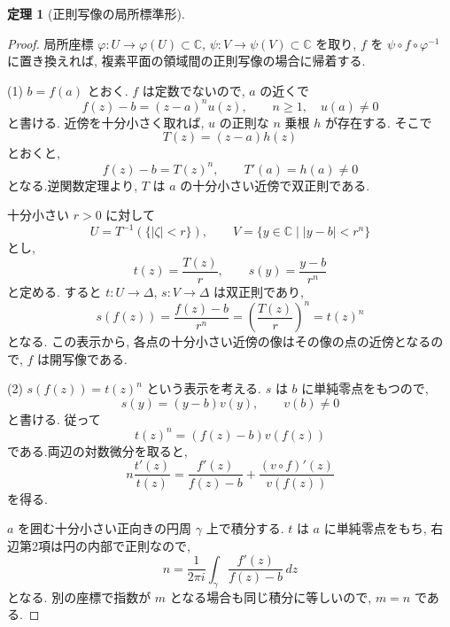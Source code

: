 \documentclass[dvipdfmx,a4paper,11pt]{article} %
\newcommand{\C}{\mathbb{C}}
\theoremstyle{definition}
\newtheorem{thm}{定理}[section]
\numberwithin{equation}{section}
\begin{document}
\begin{thm}[正則写像の局所標準形]
\begin{center}
\end{center}

\end{thm}
\begin{proof}
局所座標 $\varphi:U\to\varphi(U)\subset\C$, $\psi:V\to\psi(V)\subset\C$ を取り, $f$ を $\psi\circ f\circ\varphi^{-1}$ に置き換えれば, 複素平面の領域間の正則写像の場合に帰着する.

(1) $b=f(a)$ とおく.
$f$ は定数でないので, $a$ の近くで
\[
f(z)-b=(z-a)^n u(z),\qquad n\geq1,\quad u(a)\neq0
\]
と書ける.
近傍を十分小さく取れば, $u$ の正則な $n$ 乗根 $h$ が存在する.
そこで
\[
T(z)=(z-a)h(z)
\]
とおくと, 
\[
f(z)-b=T(z)^n,\qquad T'(a)=h(a)\neq0
\]
となる.逆関数定理より, $T$ は $a$ の十分小さい近傍で双正則である.

十分小さい $r>0$ に対して
\[
U=T^{-1}(\{|\zeta|<r\}),\qquad
V=\{y\in\C\mid |y-b|<r^n\}
\]
とし, 
\[
t(z)=\frac{T(z)}r,\qquad s(y)=\frac{y-b}{r^n}
\]
と定める.
すると $t:U\to\Delta$, $s:V\to\Delta$ は双正則であり, 
\[
s(f(z))=\frac{f(z)-b}{r^n}
=\left(\frac{T(z)}r\right)^n=t(z)^n
\]
となる.
この表示から, 各点の十分小さい近傍の像はその像の点の近傍となるので, 
$f$ は開写像である.

(2) $s(f(z))=t(z)^n$ という表示を考える.
$s$ は $b$ に単純零点をもつので, 
\[
s(y)=(y-b)v(y),\qquad v(b)\neq0
\]
と書ける.
従って
\[
t(z)^n=(f(z)-b)v(f(z))
\]
である.両辺の対数微分を取ると, 
\[
n\frac{t'(z)}{t(z)}
=
\frac{f'(z)}{f(z)-b}
+\frac{(v\circ f)'(z)}{v(f(z))}
\]
を得る.

$a$ を囲む十分小さい正向きの円周 $\gamma$ 上で積分する.
$t$ は $a$ に単純零点をもち, 右辺第2項は円の内部で正則なので, 
\[
n=\frac{1}{2\pi i}\int_\gamma
\frac{f'(z)}{f(z)-b}\,dz
\]
となる.
別の座標で指数が $m$ となる場合も同じ積分に等しいので, $m=n$ である.
\end{proof}
\end{document}
